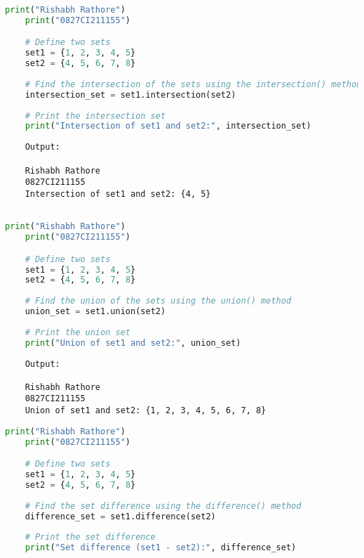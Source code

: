 \documentclass{report}
\begin{document}
\newpage


\sol 
\begin{lstlisting}[language=Python]
	print("Rishabh Rathore")
	print("0827CI211155")

	# Define two sets
	set1 = {1, 2, 3, 4, 5}
	set2 = {4, 5, 6, 7, 8}
	
	# Find the intersection of the sets using the intersection() method
	intersection_set = set1.intersection(set2)
	
	# Print the intersection set
	print("Intersection of set1 and set2:", intersection_set)
\end{lstlisting}

\begin{verbatim}
	Output:

	Rishabh Rathore
	0827CI211155
	Intersection of set1 and set2: {4, 5}
	
\end{verbatim}

\newpage


\sol 
\begin{lstlisting}[language=Python]
	print("Rishabh Rathore")
	print("0827CI211155")

	# Define two sets
	set1 = {1, 2, 3, 4, 5}
	set2 = {4, 5, 6, 7, 8}
	
	# Find the union of the sets using the union() method
	union_set = set1.union(set2)
	
	# Print the union set
	print("Union of set1 and set2:", union_set)
\end{lstlisting}

\begin{verbatim}
	Output:

	Rishabh Rathore
	0827CI211155
	Union of set1 and set2: {1, 2, 3, 4, 5, 6, 7, 8}

\end{verbatim}

\newpage


\sol 
\begin{lstlisting}[language=Python]
	print("Rishabh Rathore")
	print("0827CI211155")

	# Define two sets
	set1 = {1, 2, 3, 4, 5}
	set2 = {4, 5, 6, 7, 8}
	
	# Find the set difference using the difference() method
	difference_set = set1.difference(set2)
	
	# Print the set difference
	print("Set difference (set1 - set2):", difference_set)
\end{lstlisting}
\end{document}
